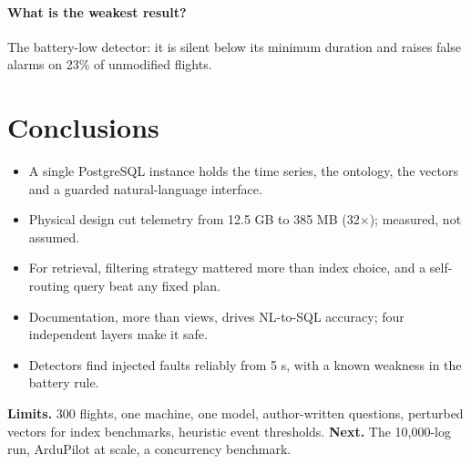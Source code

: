 \documentclass[11pt,a4paper]{article}
\begin{document}
\paragraph{What is the weakest result?}
The battery-low detector: it is silent below its minimum duration and raises false alarms on 23\% of unmodified flights.

\section{Conclusions}
\begin{itemize}
  \item A single PostgreSQL instance holds the time series, the ontology, the vectors and a guarded natural-language interface.
  \item Physical design cut telemetry from 12.5 GB to 385 MB (32$\times$); measured, not assumed.
  \item For retrieval, filtering strategy mattered more than index choice, and a self-routing query beat any fixed plan.
  \item Documentation, more than views, drives NL-to-SQL accuracy; four independent layers make it safe.
  \item Detectors find injected faults reliably from 5 s, with a known weakness in the battery rule.
\end{itemize}
\textbf{Limits.} 300 flights, one machine, one model, author-written questions, perturbed vectors for index benchmarks, heuristic event thresholds. \textbf{Next.} The 10,000-log run, ArduPilot at scale, a concurrency benchmark.
\end{document}

